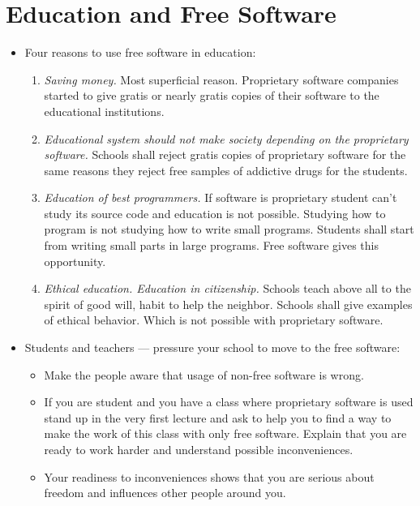 \documentclass[twoside,openright]{report}
\begin{document}
\section{Education and Free Software}
\begin{itemize}
 \item    Four reasons to use free software in education:
\begin{enumerate}
 \item        \emph{Saving money.} Most superficial reason. Proprietary software companies started to give gratis or nearly gratis copies of their software to the educational institutions.
 \item        \emph{Educational system should not make society depending on the proprietary software.} Schools shall reject gratis copies of proprietary software for the same reasons they reject free samples of addictive drugs for the students.
 \item        \emph{Education of best programmers.} If software is proprietary student can't study its source code and education is not possible. Studying how to program is not studying how to write small programs. Students shall start from writing small parts in large programs. Free software gives this opportunity.
 \item        \emph{Ethical education. Education in citizenship.} Schools teach above all to the spirit of good will, habit to help the neighbor. Schools shall give examples of ethical behavior. Which is not possible with proprietary software.
\end{enumerate}
 \item    Students and teachers --- pressure your school to move to the free software:
\begin{itemize}
 \item        Make the people aware that usage of non-free software is wrong.
 \item        If you are student and you have a class where proprietary software is used stand up in the very first lecture and ask to help you to find a way to make the work of this class with only free software. Explain that you are ready to work harder and understand possible inconveniences.
 \item        Your readiness to inconveniences shows that you are serious about freedom and influences other people around you.
\end{itemize}
\end{itemize}
\end{document}
